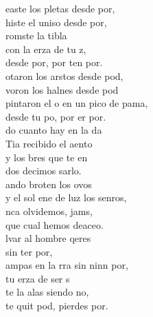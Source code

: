 \documentclass[12pt]{article}
\begin{document}
\begin{multicols*}{2}
\begin{cancion}%
	easte los pletas desde  por,\\
	histe el uniso desde  por,\\
	romste la tibla \\
	con la erza de tu z,\\
	desde  por, por ten por.\\
\jump
	otaron los arstos desde  pod,\\
	voron los halnes desde pod\\
	pintaron el o en un pico de pama,\\
	desde tu po, por er por.\\
\jump
	do cuanto hay en la da\\
	Tia recibido el aento\\
	y los bres que te en\\
	dos decimos sarlo.  \\
\jump
	ando broten los ovos\\
	y el sol ene de luz los senros,\\
	nca olvidemos, jams,\\
	que cual  hemos deaceo.\\
\jump
	lvar al hombre qeres \\
	sin ter por,\\
	ampas en la rra sin ninn por, \\
	tu erza de ser s\\
	te la alas siendo no, \\
	te quit pod, pierdes  por.\\

\end{cancion}
\end{multicols*}
\end{document}
